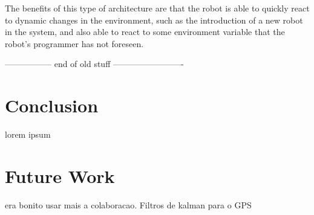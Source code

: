 \documentclass[oribibl]{llncs}
\begin{document}
The benefits of this type of architecture are that the robot is able to quickly react to dynamic changes in the environment, such as the introduction of a new robot in the system, and also able to react to some environment variable that the robot's programmer has not foreseen.

----------------- end of old stuff -------------------------


\section{Conclusion}
lorem ipsum

\section{Future Work}
era bonito usar mais a colaboracao.
Filtros de kalman para o GPS



\end{document}

